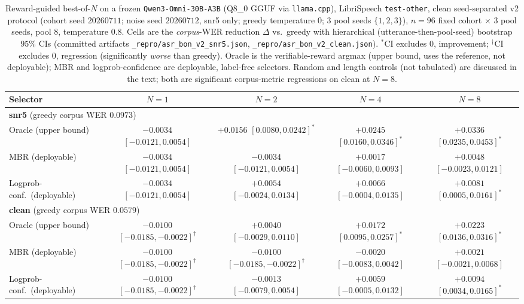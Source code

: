 \begin{table}[t]
\centering
\footnotesize
\caption{Reward-guided best-of-$N$ on a frozen \texttt{Qwen3-Omni-30B-A3B} (Q8\_0 GGUF via \texttt{llama.cpp}), LibriSpeech \texttt{test-other}, clean seed-separated v2 protocol (cohort seed $20260711$; noise seed $20260712$, snr5 only; greedy temperature $0$; $3$ pool seeds $\{1,2,3\}$), $n{=}96$ fixed cohort $\times$ $3$ pool seeds, pool $8$, temperature $0.8$. Cells are the \emph{corpus}-WER reduction $\Delta$ vs.\ greedy with hierarchical (utterance-then-pool-seed) bootstrap $95\%$ CIs (committed artifacts \texttt{\_repro/asr\_bon\_v2\_snr5.json}, \texttt{\_repro/asr\_bon\_v2\_clean.json}). $^{*}$CI excludes $0$, improvement; $^{\dagger}$CI excludes $0$, regression (significantly \emph{worse} than greedy). Oracle is the verifiable-reward argmax (upper bound, uses the reference, not deployable); MBR and logprob-confidence are deployable, label-free selectors. Random and length controls (not tabulated) are discussed in the text; both are significant corpus-metric regressions on clean at $N{=}8$.}
\label{tab:bon}
\begin{tabular}{lcccc}
\toprule
Selector & $N{=}1$ & $N{=}2$ & $N{=}4$ & $N{=}8$ \\
\midrule
\multicolumn{5}{l}{\textbf{snr5} (greedy corpus WER $0.0973$)} \\
Oracle (upper bound)       & $-0.0034$ $[-0.0121,0.0054]$ & $+0.0156$ $[0.0080,0.0242]^{*}$ & $+0.0245$ $[0.0160,0.0346]^{*}$ & $+0.0336$ $[0.0235,0.0453]^{*}$ \\
MBR (deployable)           & $-0.0034$ $[-0.0121,0.0054]$ & $-0.0034$ $[-0.0121,0.0054]$ & $+0.0017$ $[-0.0060,0.0093]$ & $+0.0048$ $[-0.0023,0.0121]$ \\
Logprob-conf.\ (deployable) & $-0.0034$ $[-0.0121,0.0054]$ & $+0.0054$ $[-0.0024,0.0134]$ & $+0.0066$ $[-0.0004,0.0135]$ & $+0.0081$ $[0.0005,0.0161]^{*}$ \\
\midrule
\multicolumn{5}{l}{\textbf{clean} (greedy corpus WER $0.0579$)} \\
Oracle (upper bound)       & $-0.0100$ $[-0.0185,-0.0022]^{\dagger}$ & $+0.0040$ $[-0.0029,0.0110]$ & $+0.0172$ $[0.0095,0.0257]^{*}$ & $+0.0223$ $[0.0136,0.0316]^{*}$ \\
MBR (deployable)           & $-0.0100$ $[-0.0185,-0.0022]^{\dagger}$ & $-0.0100$ $[-0.0185,-0.0022]^{\dagger}$ & $-0.0020$ $[-0.0083,0.0042]$ & $+0.0021$ $[-0.0021,0.0068]$ \\
Logprob-conf.\ (deployable) & $-0.0100$ $[-0.0185,-0.0022]^{\dagger}$ & $-0.0013$ $[-0.0079,0.0054]$ & $+0.0059$ $[-0.0005,0.0132]$ & $+0.0094$ $[0.0034,0.0165]^{*}$ \\
\bottomrule
\end{tabular}
\end{table}

